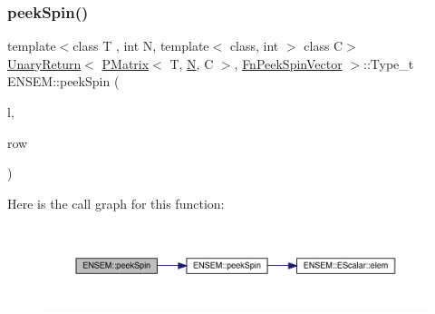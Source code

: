 \subsubsection{\texorpdfstring{peekSpin()}{peekSpin()}\hspace{0.1cm}{\footnotesize\ttfamily [1/2]}}
{\footnotesize\ttfamily template$<$class T , int N, template$<$ class, int $>$ class C$>$ \\
\mbox{\hyperlink{structENSEM_1_1UnaryReturn}{Unary\+Return}}$<$ \mbox{\hyperlink{classENSEM_1_1PMatrix}{P\+Matrix}}$<$ T, \mbox{\hyperlink{adat__devel_2lib_2hadron_2operator__name__util_8cc_a7722c8ecbb62d99aee7ce68b1752f337}{N}}, C $>$, \mbox{\hyperlink{structENSEM_1_1FnPeekSpinVector}{Fn\+Peek\+Spin\+Vector}} $>$\+::Type\+\_\+t E\+N\+S\+E\+M\+::peek\+Spin (\begin{DoxyParamCaption}\item[{const \mbox{\hyperlink{classENSEM_1_1PMatrix}{P\+Matrix}}$<$ T, \mbox{\hyperlink{adat__devel_2lib_2hadron_2operator__name__util_8cc_a7722c8ecbb62d99aee7ce68b1752f337}{N}}, C $>$ \&}]{l,  }\item[{int}]{row }\end{DoxyParamCaption})\hspace{0.3cm}{\ttfamily [inline]}}

Here is the call graph for this function\+:\nopagebreak
\begin{figure}[H]
\begin{center}
\leavevmode
\includegraphics[width=350pt]{df/d0a/group__primmatrix_gaf26619f85146d483d1c177abf5c2f476_cgraph}
\end{center}
\end{figure}
\mbox{\label{group__primmatrix_ga2efe19b2ef4dc4cbacc12117645bf8b8}} 
